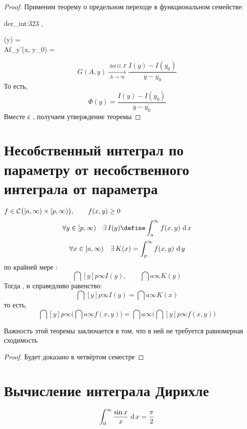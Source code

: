 \begin{proof}
	Применим теорему о предельном переходе в функциональном семействе:
	\begin{equ}{der_int:323}
		,  \implies
		\begin{cases}
			\exist {} \Phi(y) =  \\
			\exist {} A{f_y'(x, y_0)} = 
		\end{cases}
	\end{equ}
	$$ G(A, y) \xrightarrow[A \to \infty]{\operatorname{def} G, F} \frac{I(y) - I(y_0)}{y - y_0} $$
	То есть,
	$$ \Phi(y) = \frac{I(y) - I(y_0)}{y - y_0} $$
	Вместе с , получаем утверждение теоремы
\end{proof}

\section{Несобственный интеграл по параметру от несобственного интеграла от параметра}

\begin{theorem}
	$ f \in \Cont{[a, \infty) \times [p, \infty)}, \qquad f(x, y) \ge 0 $
	$$ \forall y \in [p, \infty) \quad \exist I(y) \define \dint{a}\infty{f(x, y)} $$
	$$ \forall x \in [a, \infty) \quad \exist K(x) = \dint[y]p\infty{f(x, y)} $$
	 по крайней мере :
	$$ \dint[y]p\infty{I(y)}, \qquad \dint{a}\infty{K(y)} $$
	Тогда , и справедливо равенство:
	$$ \dint[y]p\infty{I(y)} \bm= \dint{a}\infty{K(x)} $$
	то есть,
	$$ \dint[y]p\infty{\bigg( \dint{a}\infty{f(x, y)} \bigg)} \bm= \dint{a}\infty{\bigg( \dint[y]p\infty{f(x, y)} \bigg)} $$
\end{theorem}

\begin{remark}
	Важность этой теоремы заключается в том, что в ней не требуется равномерная сходимость
\end{remark}

\begin{proof}
	Будет доказано в четвёртом семестре
\end{proof}

\section{Вычисление интеграла Дирихле}

\begin{theorem}
	$$ \dint0\infty{\frac{\sin x}x} = \half[\pi] $$
\end{theorem}

